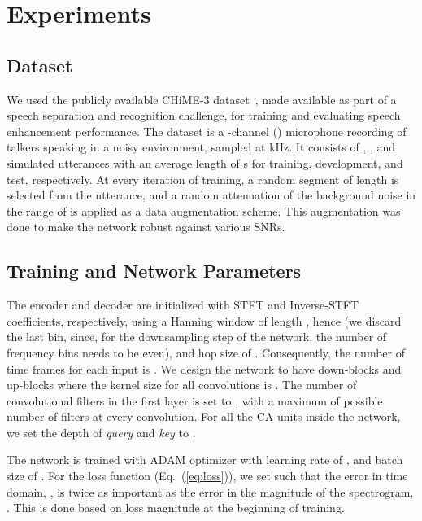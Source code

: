 \documentclass{article}
\begin{document}
\section{Experiments}
\label{sec:exp}
\vspace{-2mm}
\subsection{Dataset}

We used the publicly available CHiME-3 dataset~\cite{chime}, made available as part of a speech separation and recognition challenge, for training and evaluating speech enhancement performance. The dataset is a -channel () microphone recording of talkers speaking in a noisy environment, sampled at  kHz. It consists of , , and  simulated utterances with an average length of  s for training, development, and test, respectively. At every iteration of training, a random segment of length  is selected from the utterance, and a random attenuation of the background noise in the range of  is applied as a data augmentation scheme. This augmentation was done to make the network robust against various SNRs.
\vspace{-2mm}
\subsection{Training and Network Parameters}
The encoder and decoder are initialized with STFT and Inverse-STFT coefficients, respectively, using a Hanning window of length , hence  (we discard the last bin, since, for the downsampling step of the network, the number of frequency bins needs to be even), and hop size of . Consequently, the number of time frames for each input is . We design the network to have  down-blocks and  up-blocks  where the kernel size for all convolutions is . The number of convolutional filters in the first layer is set to , with a maximum of  possible number of filters at every convolution. For all the CA units inside the network, we set the depth of {\it query} and {\it key} to .

The network is trained with ADAM optimizer with learning rate of , and batch size of . For the loss function (Eq.~(\ref{eq:loss})), we set  such that the error in time domain, , is twice as important as the error in the magnitude of the spectrogram, . This is done based on loss magnitude at the beginning of training.





\vspace{-2mm}
\end{document}
